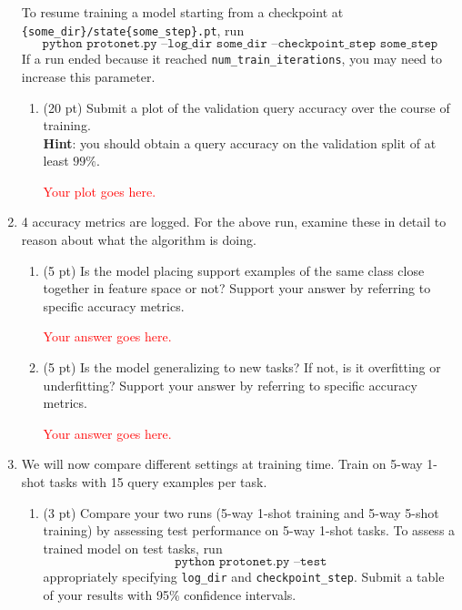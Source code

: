 \documentclass[12pt]{article}
\begin{document}
\begin{enumerate}
    To resume training a model starting from a checkpoint at \texttt{\{some\_dir\}/state\{some\_step\}.pt}, run
    \begin{equation*}
        \texttt{python protonet.py --log\_dir some\_dir --checkpoint\_step some\_step}
    \end{equation*}
    If a run ended because it reached \texttt{num\_train\_iterations}, you may need to increase this parameter.
    
    \newpage
    \begin{enumerate}[label=(\alph*)]
        \item (20 pt) Submit a plot of the validation query accuracy over the course of training. \\
        \textbf{Hint}: you should obtain a query accuracy on the validation split of at least $99\%$.
        
        \textcolor{red}{Your plot goes here.}
        
    \end{enumerate}
    
    \newpage
    \item 4 accuracy metrics are logged. For the above run, examine these in detail to reason about what the algorithm is doing.
    \begin{enumerate}[label=(\alph*)]
        \item (5 pt) Is the model placing support examples of the same class close together in feature space or not? Support your answer by referring to specific accuracy metrics.
        
        \textcolor{red}{Your answer goes here.}

        
        \item (5 pt) Is the model generalizing to new tasks? If not, is it overfitting or underfitting? Support your answer by referring to specific accuracy metrics.
        
        \textcolor{red}{Your answer goes here.}

    \end{enumerate}
    
    \newpage
    \item We will now compare different settings at training time. Train on 5-way 1-shot tasks with 15 query examples per task. 
    \begin{enumerate}
        \item (3 pt) Compare your two runs (5-way 1-shot training and 5-way 5-shot training) by assessing test performance on 5-way 1-shot tasks. To assess a trained model on test tasks, run
        \begin{equation*}
            \texttt{python protonet.py --test}
        \end{equation*}
    appropriately specifying \texttt{log\_dir} and \texttt{checkpoint\_step}. Submit a table of your results with 95\% confidence intervals.
        

\end{enumerate}
\end{enumerate}
\end{document}
